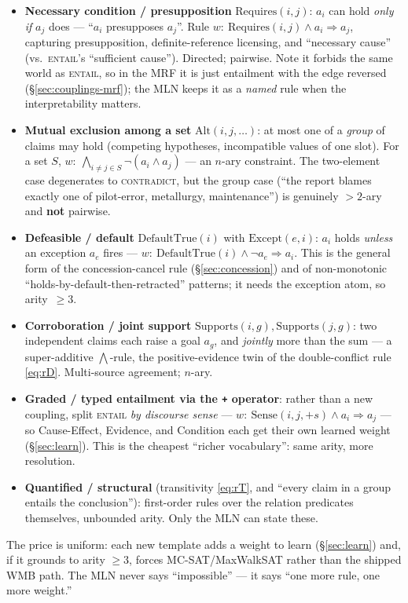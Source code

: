 \documentclass[11pt]{article}
\newcommand{\Ent}{\textsc{entail}}
\newcommand{\Con}{\textsc{contradict}}
\begin{document}
\begin{itemize}[leftmargin=*]
  \item \textbf{Necessary condition / presupposition} $\mathrm{Requires}(i,j)$: $a_i$ can hold
        \emph{only if} $a_j$ does --- ``$a_i$ presupposes $a_j$''. Rule
        \(w:\ \mathrm{Requires}(i,j)\wedge a_i\Rightarrow a_j\), capturing presupposition,
        definite-reference licensing, and ``necessary cause'' (vs.\ \Ent's ``sufficient
        cause''). Directed; pairwise. Note it forbids the same world as \Ent{}, so in the MRF
        it is just entailment with the edge reversed (\S\ref{sec:couplings-mrf}); the MLN
        keeps it as a \emph{named} rule when the interpretability matters.
  \item \textbf{Mutual exclusion among a set} $\mathrm{Alt}(i,j,\dots)$: at most one of a
        \emph{group} of claims may hold (competing hypotheses, incompatible values of one
        slot). For a set $S$, \(w:\ \bigwedge_{i\ne j\in S}\neg(a_i\wedge a_j)\) --- an
        $n$-ary constraint. The two-element case degenerates to \Con{}, but the group case
        (``the report blames exactly one of pilot-error, metallurgy, maintenance'') is
        genuinely $>2$-ary and \textbf{not} pairwise.
  \item \textbf{Defeasible / default} $\mathrm{DefaultTrue}(i)$ with $\mathrm{Except}(e,i)$:
        $a_i$ holds \emph{unless} an exception $a_e$ fires ---
        \(w:\ \mathrm{DefaultTrue}(i)\wedge\neg a_e\Rightarrow a_i\). This is the general form
        of the concession-cancel rule (\S\ref{sec:concession}) and of non-monotonic
        ``holds-by-default-then-retracted'' patterns; it needs the exception atom, so
        arity~$\ge 3$.
  \item \textbf{Corroboration / joint support} $\mathrm{Supports}(i,g),\mathrm{Supports}(j,g)$:
        two independent claims each raise a goal $a_g$, and \emph{jointly} more than the sum
        --- a super-additive $\bigwedge$-rule, the positive-evidence twin of the
        double-conflict rule \eqref{eq:rD}. Multi-source agreement; $n$-ary.
  \item \textbf{Graded / typed entailment via the \texttt{+} operator}: rather than a new
        coupling, split \Ent{} \emph{by discourse sense} ---
        \(w:\ \mathrm{Sense}(i,j,+s)\wedge a_i\Rightarrow a_j\) --- so Cause-Effect, Evidence,
        and Condition each get their own learned weight (\S\ref{sec:learn}). This is the
        cheapest ``richer vocabulary'': same arity, more resolution.
  \item \textbf{Quantified / structural} (transitivity \eqref{eq:rT}, and ``every claim in a
        group entails the conclusion''): first-order rules over the relation predicates
        themselves, unbounded arity. Only the MLN can state these.
\end{itemize}
The price is uniform: each new template adds a weight to learn (\S\ref{sec:learn}) and, if it
grounds to arity $\ge 3$, forces MC-SAT/MaxWalkSAT rather than the shipped WMB path. The MLN
never says ``impossible'' --- it says ``one more rule, one more weight.''
\end{document}
